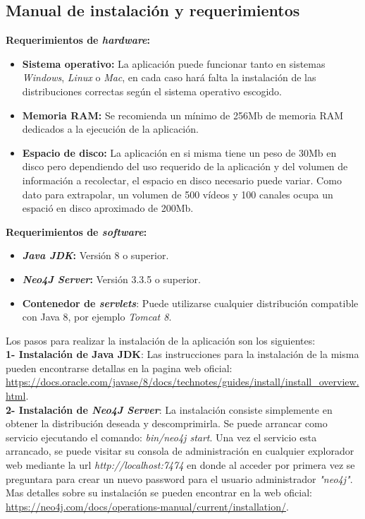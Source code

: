 \documentclass[11pt,a4paper]{article}
\begin{document}
\subsection{Manual de instalación y requerimientos}\label{Manual} 
\noindent\textbf{Requerimientos de \textit{hardware}:}
\begin{itemize}
\item \textbf{Sistema operativo:} La aplicación puede funcionar tanto en sistemas \textit{Windows}, \textit{Linux} o \textit{Mac}, en cada caso hará falta la instalación de las distribuciones correctas según el sistema operativo escogido.
\item \textbf{Memoria RAM:} Se recomienda un mínimo de 256Mb de memoria RAM dedicados a la ejecución de la aplicación.
\item \textbf{Espacio de disco:} La aplicación en si misma tiene un peso de 30Mb en disco pero dependiendo del uso requerido de la aplicación y del volumen de información a recolectar, el espacio en disco necesario puede variar. Como dato para extrapolar, un volumen de 500 vídeos y 100 canales ocupa un espació en disco aproximado de 200Mb.
\end{itemize}

\noindent\textbf{Requerimientos de \textit{software}:}
\begin{itemize}
\item \textbf{\textit{Java JDK}:} Versión 8 o superior.
\item \textbf{\textit{Neo4J Server}:} Versión 3.3.5 o superior.
\item \textbf{Contenedor de \textit{servlets}}: Puede utilizarse cualquier distribución compatible con Java 8, por ejemplo \textit{Tomcat 8}.
\end{itemize}
\bigskip 

Los pasos para realizar la instalación de la aplicación son los siguientes:
\\

\noindent\textbf{1- Instalación de Java JDK}: Las instrucciones para la instalación de la misma pueden encontrarse detallas en la pagina web oficial: \url{https://docs.oracle.com/javase/8/docs/technotes/guides/install/install_overview.html}.
\\

\noindent\textbf{2- Instalación de \textit{Neo4J Server}}: La instalación consiste simplemente en obtener la distribución deseada y descomprimirla. Se puede arrancar como servicio ejecutando el comando: \textit{bin/neo4j start}. Una vez el servicio esta arrancado, se puede visitar su consola de administración en cualquier explorador web mediante la url  \textit{http://localhost:7474} en donde al acceder por primera vez se preguntara para crear un nuevo password para el usuario administrador \textit{"neo4j"}. Mas detalles sobre su instalación se pueden encontrar en la web oficial: \url{https://neo4j.com/docs/operations-manual/current/installation/}.
\\
\end{document}
